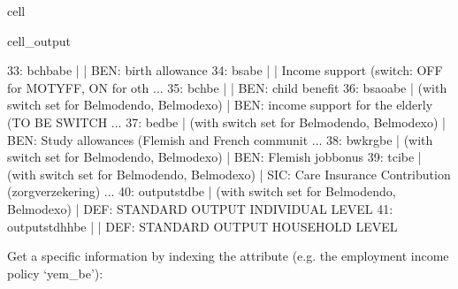 \documentclass[letterpaper,10pt,english]{sphinxmanual}
\begin{document}
\begin{sphinxuseclass}{cell}
\begin{sphinxuseclass}{cell_output}
\begin{sphinxVerbatim}[commandchars=\\\{\}]
33: bchba\PYGZus{}be             |                                                       |    BEN: birth allowance 
34: bsa\PYGZus{}be               |                                                       |    Income support (switch: OFF for MOTYFF, ON for oth ... 
35: bch\PYGZus{}be               |                                                       |    BEN: child benefit 
36: bsaoa\PYGZus{}be             |  (with switch set for Belmod\PYGZus{}endo, Belmod\PYGZus{}exo)        |    \PYGZdq{}BEN: income support for the elderly (TO BE SWITCH ... 
37: bed\PYGZus{}be               |  (with switch set for Belmod\PYGZus{}endo, Belmod\PYGZus{}exo)        |    BEN: Study allowances (Flemish and French communit ... 
38: bwkrg\PYGZus{}be             |  (with switch set for Belmod\PYGZus{}endo, Belmod\PYGZus{}exo)        |    BEN: Flemish jobbonus 
39: tci\PYGZus{}be               |  (with switch set for Belmod\PYGZus{}endo, Belmod\PYGZus{}exo)        |    SIC: Care Insurance Contribution (zorgverzekering) ... 
40: output\PYGZus{}std\PYGZus{}be        |  (with switch set for Belmod\PYGZus{}endo, Belmod\PYGZus{}exo)        |    DEF: STANDARD OUTPUT INDIVIDUAL LEVEL 
41: output\PYGZus{}std\PYGZus{}hh\PYGZus{}be     |                                                       |    DEF: STANDARD OUTPUT HOUSEHOLD LEVEL 
\end{sphinxVerbatim}

\end{sphinxuseclass}
\end{sphinxuseclass}
\sphinxAtStartPar
Get a  specific information by indexing the  attribute (e.g. the employment income policy ‘yem\_be’):
\end{document}
